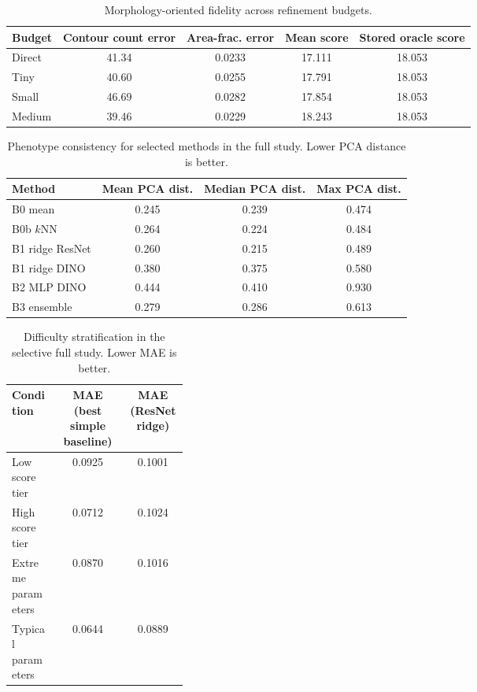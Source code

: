 \documentclass[11pt,a4paper]{article}
\begin{document}
\begin{table}[H]
\centering
\caption{Morphology-oriented fidelity across refinement budgets.}
\label{tab:morphB}
\small
\begin{tabular}{lcccc}
\toprule
Budget & Contour count error & Area-frac. error & Mean score & Stored oracle score \\
\midrule
Direct & 41.34 & 0.0233 & 17.111 & 18.053 \\
Tiny & 40.60 & 0.0255 & 17.791 & 18.053 \\
Small & 46.69 & 0.0282 & 17.854 & 18.053 \\
Medium & 39.46 & 0.0229 & 18.243 & 18.053 \\
\bottomrule
\end{tabular}
\end{table}

\begin{table}[H]
\centering
\caption{Phenotype consistency for selected methods in the full study. Lower PCA distance is better.}
\label{tab:phenoB}
\small
\begin{tabular}{lccc}
\toprule
Method & Mean PCA dist. & Median PCA dist. & Max PCA dist. \\
\midrule
B0 mean & 0.245 & 0.239 & 0.474 \\
B0b $k$NN & 0.264 & 0.224 & 0.484 \\
B1 ridge ResNet & 0.260 & 0.215 & 0.489 \\
B1 ridge DINO & 0.380 & 0.375 & 0.580 \\
B2 MLP DINO & 0.444 & 0.410 & 0.930 \\
B3 ensemble & 0.279 & 0.286 & 0.613 \\
\bottomrule
\end{tabular}
\end{table}

\begin{table}[H]
\centering
\caption{Difficulty stratification in the selective full study. Lower MAE is better.}
\label{tab:strataB}
\small
\begin{tabular}{p{0.26\linewidth}cc}
\toprule
Condition & MAE (best simple baseline) & MAE (ResNet ridge) \\
\midrule
Low score tier & 0.0925 & 0.1001 \\
High score tier & 0.0712 & 0.1024 \\
Extreme parameters & 0.0870 & 0.1016 \\
Typical parameters & 0.0644 & 0.0889 \\
\bottomrule
\end{tabular}
\end{table}
\end{document}

